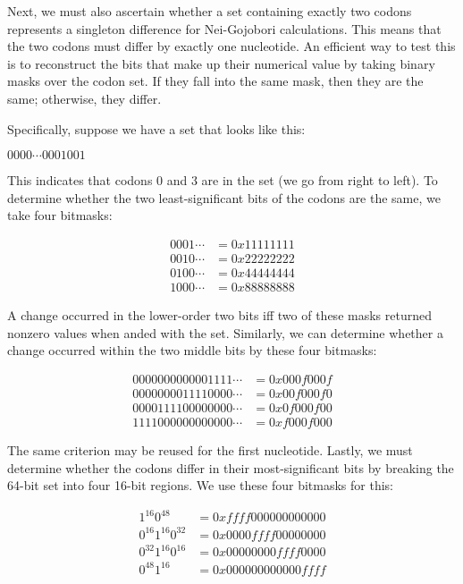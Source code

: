 \documentclass{article}
\begin{document}
      Next, we must also ascertain whether a set containing exactly two codons
      represents a singleton difference for Nei-Gojobori calculations. This
      means that the two codons must differ by exactly one nucleotide. An
      efficient way to test this is to reconstruct the bits that make up their
      numerical value by taking binary masks over the codon set. If they fall
      into the same mask, then they are the same; otherwise, they differ.

      Specifically, suppose we have a set that looks like this:

      \begin{center}
        $0000 \cdots 0001001$
      \end{center}

      \noindent This indicates that codons 0 and 3 are in the set (we go from
	  right to left). To determine whether the two least-significant bits
      of the codons are the same, we take four bitmasks:

      \begin{align*}
        0001 \cdots & = 0x11111111 \\ %
        0010 \cdots & = 0x22222222 \\ %
        0100 \cdots & = 0x44444444 \\ %
        1000 \cdots & = 0x88888888
      \end{align*}

      A change occurred in the lower-order two bits iff two of these masks
      returned nonzero values when anded with the set. Similarly, we can
      determine whether a change occurred within the two middle bits by these
      four bitmasks:

      \begin{align*}
        0000000000001111 \cdots & = 0x000f000f \\ %
        0000000011110000 \cdots & = 0x00f000f0 \\ %
        0000111100000000 \cdots & = 0x0f000f00 \\ %
        1111000000000000 \cdots & = 0xf000f000
      \end{align*}

      The same criterion may be reused for the first nucleotide. Lastly, we must
      determine whether the codons differ in their most-significant bits by
      breaking the 64-bit set into four 16-bit regions. We use these four
      bitmasks for this:

      \begin{align*}
	1^{16}0^{48} 		& = 0xffff000000000000 \\ %
	0^{16}1^{16}0^{32}	& = 0x0000ffff00000000 \\ %
	0^{32}1^{16}0^{16}	& = 0x00000000ffff0000 \\ %
	0^{48}1^{16}		& = 0x000000000000ffff
      \end{align*}
\end{document}
